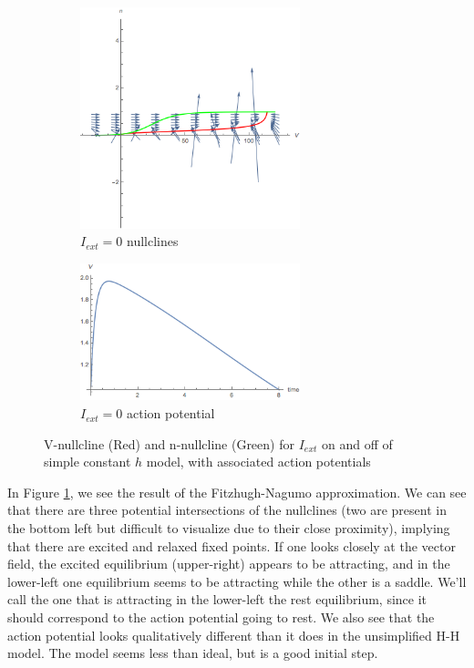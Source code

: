 \documentclass[12]{book}
\newcommand\0{\mathbf{0}}
\newcommand\<{\langle}
\renewcommand\>{\rangle}
\begin{document}
\begin{figure}[h]
\centering
\begin{subfigure}{0.7\textwidth}
	\centering
	\includegraphics[width=0.7\textwidth]{fastFast_nullc.png}
	\caption{$I_{ext}=0$ nullclines}
\end{subfigure}
\begin{subfigure}{0.7\textwidth}
	\centering
	\includegraphics[width=0.7\textwidth]{fastFast.png}
	\caption{$I_{ext}=0$ action potential}
\end{subfigure}
	\caption{V-nullcline (Red) and n-nullcline (Green) for $I_{ext}$ on and off of simple constant $h$ model, with associated action potentials}
	\label{fig:first}
\end{figure}

In Figure \ref{fig:first}, we see the result of the Fitzhugh-Nagumo approximation. We can see that there are three potential intersections of the nullclines (two are present in the bottom left but difficult to visualize due to their close proximity), implying that there are excited and relaxed fixed points. If one looks closely at the vector field, the excited equilibrium (upper-right) appears to be attracting, and in the lower-left one equilibrium seems to be attracting while the other is a saddle. We'll call the one that is attracting in the lower-left the rest equilibrium, since it should correspond to the action potential going to rest. We also see that the action potential looks qualitatively different than it does in the unsimplified H-H model. The model seems less than ideal, but is a good initial step. 
\end{document}
